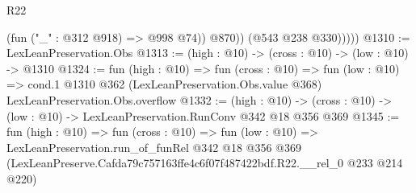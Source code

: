 \begin{lexlean}{R22}
\begin{coremodule}
                  (fun ("_" : @312 @918) => @998 @74))
                @870))
            (@543 @238 @330)))))
@1310 := LexLeanPreservation.Obs
@1313 := (high : @10) -> (cross : @10) -> (low : @10) -> @1310
@1324 := fun (high : @10) =>
  fun (cross : @10) =>
  fun (low : @10) =>
  cond.{1} @1310 @362 (LexLeanPreservation.Obs.value @368) LexLeanPreservation.Obs.overflow
@1332 := (high : @10) ->
  (cross : @10) -> (low : @10) -> LexLeanPreservation.RunConv @342 @18 @356 @369
@1345 := fun (high : @10) =>
  fun (cross : @10) =>
  fun (low : @10) =>
  LexLeanPreservation.run_of_funRel
    @342
    @18
    @356
    @369
    (LexLeanPreserve.Cafda79c757163ffe4c6f07f487422bdf.R22.__rel_0 @233 @214 @220)
\end{coremodule}
\end{lexlean}
